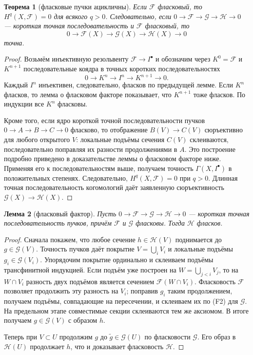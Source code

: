 \documentclass[11pt,b5paper,oneside]{article}
\newcommand{\F}{\mathscr F}
\newcommand{\G}{\mathscr G}
\newcommand{\Hh}{\mathscr H}
\theoremstyle{plain}
\newtheorem{thm}{Теорема}[section]
\newtheorem{lem}[thm]{Лемма}
\theoremstyle{definition}
\theoremstyle{remark}
\begin{document}
\begin{thm}[фласковые пучки ацикличны]
Если $\F$ фласковый, то $H^q(X,\F)=0$ для всякого $q>0$.
Следовательно, если $0\to\F\to\G\to\Hh\to0$ --- короткая точная
последовательность и $\F$ фласковый, то
\[
  0\to\F(X)\to\G(X)\to\Hh(X)\to0
\]
точна.
\end{thm}
\begin{proof}
Возьмём инъективную резольвенту $\F\to I^\bullet$ и обозначим через
$K^0=\F$ и $K^{n+1}$ последовательные коядра в точных коротких
последовательностях
\[
  0\longrightarrow K^n\longrightarrow I^n\longrightarrow K^{n+1}
  \longrightarrow0.
\]
Каждый $I^n$ инъективен, следовательно, фласков по предыдущей лемме.
Если $K^n$ фласков, то лемма о фласковом факторе показывает, что
$K^{n+1}$ тоже фласков. По индукции все $K^n$ фласковы.

Кроме того, если ядро короткой точной последовательности пучков
$0\to A\to B\to C\to0$ фласково, то отображение $B(V)\to C(V)$
сюръективно для любого открытого $V$: локальные подъёмы сечения $C(V)$
склеиваются, последовательно поправляя их разности продолжениями в $A$.
Это построение подробно приведено в доказательстве леммы о фласковом
факторе ниже. Применяя его к последовательностям выше, получаем точность
$\Gamma(X,I^\bullet)$ в положительных степенях. Следовательно,
$H^q(X,\F)=0$ при $q>0$. Длинная точная последовательность когомологий
даёт заявленную сюръективность $\G(X)\to\Hh(X)$.
\end{proof}

\begin{lem}[фласковый фактор]
Пусть $0\to\F\to\G\to\Hh\to0$ --- короткая точная последовательность
пучков, причём $\F$ и $\G$ фласковы. Тогда $\Hh$ фласков.
\end{lem}
\begin{proof}
Сначала покажем, что любое сечение $h\in\Hh(V)$ поднимается до
$g\in\G(V)$. Точность пучков даёт покрытие $V=\bigcup_iV_i$ и
локальные подъёмы $g_i\in\G(V_i)$. Упорядочим покрытие ординально и
склеиваем подъёмы трансфинитной индукцией. Если подъём уже построен на
$W=\bigcup_{j<i}V_j$, то на $W\cap V_i$ разность двух подъёмов является
сечением $\F(W\cap V_i)$. Фласковость $\F$ позволяет продолжить эту
разность на $V_i$; поправив $g_i$ таким продолжением, получаем подъёмы,
совпадающие на пересечении, и склеиваем их по (F2) для $\G$. На предельном
этапе совместимые секции склеиваются тем же аксиомом. В итоге получаем
$g\in\G(V)$ с образом $h$.

Теперь при $V\subset U$ продолжим $g$ до $\widetilde g\in\G(U)$ по
фласковости $\G$. Его образ в $\Hh(U)$ продолжает $h$, что и доказывает
фласковость $\Hh$.
\end{proof}
\end{document}
